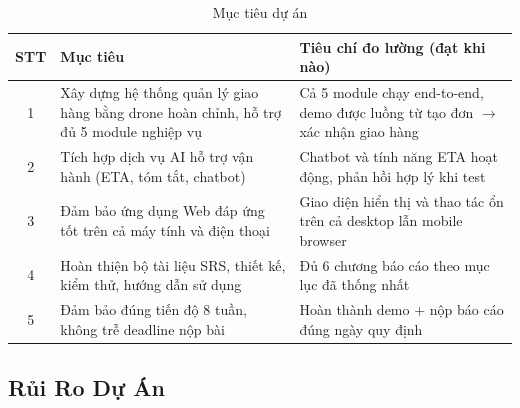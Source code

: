\begin{table}[H]
  \centering
  \begin{tabularx}{\textwidth}{|c|>{\raggedright\arraybackslash}X|>{\raggedright\arraybackslash}X|}
    \hline
    \textbf{STT} & \textbf{Mục tiêu} & \textbf{Tiêu chí đo lường (đạt khi nào)} \\
    \hline
    1 & Xây dựng hệ thống quản lý giao hàng bằng drone hoàn chỉnh, hỗ trợ đủ 5 module nghiệp vụ & Cả 5 module chạy end-to-end, demo được luồng từ tạo đơn $\rightarrow$ xác nhận giao hàng \\ \hline
    2 & Tích hợp dịch vụ AI hỗ trợ vận hành (ETA, tóm tắt, chatbot) & Chatbot và tính năng ETA hoạt động, phản hồi hợp lý khi test \\ \hline
    3 & Đảm bảo ứng dụng Web đáp ứng tốt trên cả máy tính và điện thoại & Giao diện hiển thị và thao tác ổn trên cả desktop lẫn mobile browser  \\ \hline
    4 & Hoàn thiện bộ tài liệu SRS, thiết kế, kiểm thử, hướng dẫn sử dụng & Đủ 6 chương báo cáo theo mục lục đã thống nhất \\ \hline
    5 & Đảm bảo đúng tiến độ 8 tuần, không trễ deadline nộp bài & Hoàn thành demo + nộp báo cáo đúng ngày quy định \\
    \hline
  \end{tabularx}
  \caption{Mục tiêu dự án}
  \label{tab:objectives}
\end{table}

\subsection{Rủi Ro Dự Án}

